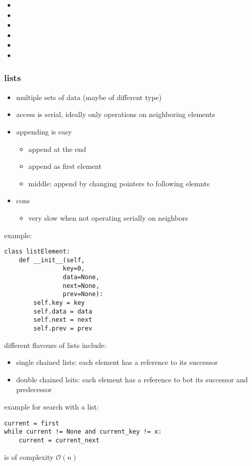 \documentclass[a4paper]{article}
\begin{document}
\begin{itemize}
    \item {}
    \item {}
    \item {}
    \item {}
    \item {}
    \item {}
\end{itemize}

\subsubsection{lists}
\begin{itemize}
    \item multiple sets of data (maybe of different type)
    \item access is serial, ideally only operations on neighboring elements
    \item appending is easy
        \begin{itemize}
            \item append at the end
            \item append as first element
            \item middle: append by changing pointers to following elemnts
        \end{itemize}
    \item cons
        \begin{itemize}
            \item very slow when not operating serially on neighbors
        \end{itemize}
\end{itemize}
example:
\begin{lstlisting}
class listElement:
    def __init__(self,
                key=0,
                data=None,
                next=None,
                prev=None):
        self.key = key
        self.data = data
        self.next = next
        self.prev = prev
\end{lstlisting}
different flavours of lists include:
\begin{itemize}
    \item single chained lists: each element has a reference to its successor
    \item double chained lsits: each element has a reference to bot its successor and predecessor
\end{itemize}
example for search with a list:
\begin{lstlisting}
current = first
while current != None and current_key != x:
    current = current_next
\end{lstlisting}
is of complexity $ \mathcal{O}(n) $
\end{document}
